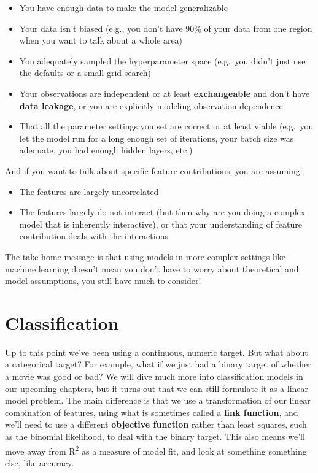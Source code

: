 \documentclass[
  letterpaper,
]{krantz}
\providecommand{\tightlist}{%
  \setlength{\itemsep}{0pt}\setlength{\parskip}{0pt}}\usepackage{longtable,booktabs,array}
\begin{document}
\begin{itemize}
\tightlist
\item
  You have enough data to make the model generalizable
\item
  Your data isn't biased (e.g., you don't have 90\% of your data from
  one region when you want to talk about a whole area)
\item
  You adequately sampled the hyperparameter space (e.g.~you didn't just
  use the defaults or a small grid search)
\item
  Your observations are independent or at least \textbf{exchangeable}
  and don't have \textbf{data leakage}, or you are explicitly modeling
  observation dependence
\item
  That all the parameter settings you set are correct or at least viable
  (e.g.~you let the model run for a long enough set of iterations, your
  batch size was adequate, you had enough hidden layers, etc.)
\end{itemize}

And if you want to talk about specific feature contributions, you are
assuming:

\begin{itemize}
\tightlist
\item
  The features are largely uncorrelated
\item
  The features largely do not interact (but then why are you doing a
  complex model that is inherently interactive), or that your
  understanding of feature contribution deals with the interactions
\end{itemize}

The take home message is that using models in more complex settings like
machine learning doesn't mean you don't have to worry about theoretical
and model assumptions, you still have much to consider!

\section{Classification}\label{sec-lm-classification}

Up to this point we've been using a continuous, numeric target. But what
about a categorical target? For example, what if we just had a binary
target of whether a movie was good or bad? We will dive much more into
classification models in our upcoming chapters, but it turns out that we
can still formulate it as a linear model problem. The main difference is
that we use a transformation of our linear combination of features,
using what is sometimes called a \textbf{link function}, and we'll need
to use a different \textbf{objective function} rather than least
squares, such as the binomial likelihood, to deal with the binary
target. This also means we'll move away from R\textsuperscript{2} as a
measure of model fit, and look at something something else, like
accuracy.
\end{document}
